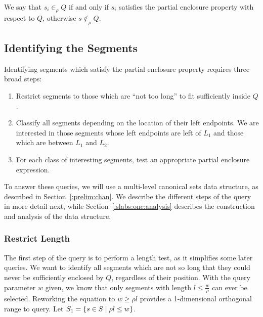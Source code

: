 We say that $s_i \in_\rho Q$ if and only if $s_i$ satisfies the partial enclosure property with respect to $Q$, otherwise $s \not \in_\rho Q$.


\subsection{Identifying the Segments}
\label{:slabs:one:approach}

Identifying segments which satisfy the partial enclosure property requires three broad steps:

\begin{enumerate}
 \item Restrict segments to those which are ``not too long'' to fit sufficiently inside $Q$.

 \item Classify all segments depending on the location of their left endpoints. We are interested in those segments whose left endpoints are left of $L_1$ and those which are between $L_1$ and $L_2$.

 \item For each class of interesting segments, test an appropriate partial enclosure expression.

\end{enumerate}

To answer these queries, we will use a multi-level canonical sets data structure, as described in Section~\ref{:prelim:chan}. 
We describe the different steps of the query in more detail next, while Section~\ref{:slabs:one:analysis} describes the construction and analysis of the data structure.


\subsubsection{Restrict Length}
\label{:slabs:one:details:restrict}

The first step of the query is to perform a length test, as it simplifies some later queries.
We want to identify all segments which are not so long that they could never be sufficiently enclosed by $Q$, regardless of their position.
With the query parameter $w$ given, we know that only segments with length $l \leq \frac{w}{\rho}$ can ever be selected.
Reworking the equation to $w \geq \rho l$ provides a 1-dimensional orthogonal range to query.
Let $S_1 = \{ s \in S \;|\; \rho l \leq w \}$.


